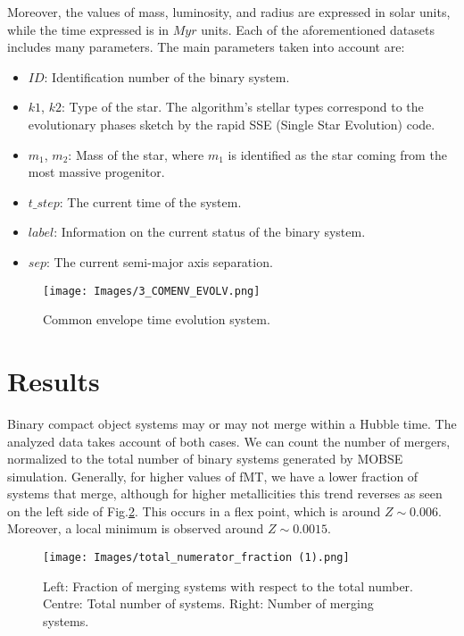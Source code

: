 \documentclass[preprint,12pt]{elsarticle}
\begin{document}
Moreover, the values of mass, luminosity, and radius are expressed in solar units, while the time expressed is in $Myr$ units. Each of the aforementioned datasets includes many parameters. The main parameters taken into account are:
\begin{itemize}
    \item $ID$: Identification number of the binary system.
    \item $k1$, $k2$: Type of the star. The algorithm's stellar types correspond to the evolutionary phases sketch by the rapid SSE (Single Star Evolution) code\citep{Hurley:2002}.
    \item $m_1$, $m_2$: Mass of the star, where $m_1$ is identified as the star coming from the most massive progenitor. 
    \item $t\_step$: The current time of the system.
    \item $label$: Information on the current status of the binary system.
    \item $sep$: The current semi-major axis separation.
\end{itemize}
\begin{figure}[h!]
\centering
\texttt{[image: Images/3\_COMENV\_EVOLV.png]}
\caption[Methods]{Common envelope time evolution system.}
\label{img:3comenvtime}
\end{figure}

\newpage
\section{Results}

Binary compact object systems may or may not merge within a Hubble time. The analyzed data takes account of both cases. We can count the number of mergers, normalized to the total number of binary systems generated by MOBSE simulation. Generally, for higher values of fMT, we have a lower fraction of systems that merge, although for higher metallicities this trend reverses as seen on the left side of Fig.\ref{img:merging_vs_Z}. This occurs in a flex point, which is around $Z \sim 0.006 $. Moreover, a local minimum is observed around $Z \sim 0.0015$.\\


\begin{figure}[ht]
    \centering
    \texttt{[image: Images/total\_numerator\_fraction (1).png]}
    \caption{Left: Fraction of merging systems with respect to the total number. Centre: Total number of systems. Right: Number of merging systems.}
    \label{img:merging_vs_Z}
\end{figure}
\end{document}
